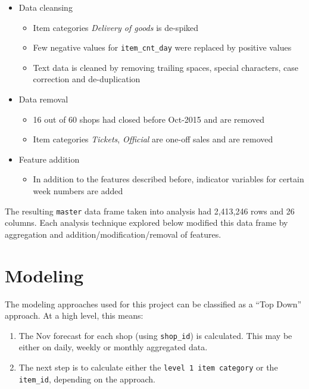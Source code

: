 \documentclass[floatsintext,man]{apa6}
\providecommand{\tightlist}{%
  \setlength{\itemsep}{0pt}\setlength{\parskip}{0pt}}
\theoremstyle{definition}
\theoremstyle{definition}
\theoremstyle{definition}
\theoremstyle{remark}
\begin{document}
\begin{itemize}
\tightlist
\item
  Data cleansing

  \begin{itemize}
  \tightlist
  \item
    Item categories \emph{Delivery of goods} is de-spiked
  \item
    Few negative values for \texttt{item\_cnt\_day} were replaced by
    positive values
  \item
    Text data is cleaned by removing trailing spaces, special
    characters, case correction and de-duplication
  \end{itemize}
\item
  Data removal

  \begin{itemize}
  \tightlist
  \item
    16 out of 60 shops had closed before Oct-2015 and are removed
  \item
    Item categories \emph{Tickets}, \emph{Official} are one-off sales
    and are removed
  \end{itemize}
\item
  Feature addition

  \begin{itemize}
  \tightlist
  \item
    In addition to the features described before, indicator variables
    for certain week numbers are added
  \end{itemize}
\end{itemize}

The resulting \texttt{master} data frame taken into analysis had
2,413,246 rows and 26 columns. Each analysis technique explored below
modified this data frame by aggregation and
addition/modification/removal of features.

\section{Modeling}\label{modeling}

The modeling approaches used for this project can be classified as a
\enquote{Top Down} approach. At a high level, this means:

\begin{enumerate}
\def\labelenumi{\arabic{enumi}.}
\tightlist
\item
  The Nov forecast for each shop (using \texttt{shop\_id}) is
  calculated. This may be either on daily, weekly or monthly aggregated
  data.
\item
  The next step is to calculate either the
  \texttt{level\ 1\ item\ category} or the \texttt{item\_id}, depending
  on the approach.
\end{enumerate}
\end{document}
